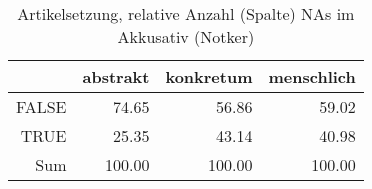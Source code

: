 \begin{table}[ht]
\centering
\begin{tabular}{rrrr}
  \hline
 & abstrakt & konkretum & menschlich \\ 
  \hline
FALSE & 74.65 & 56.86 & 59.02 \\ 
  TRUE & 25.35 & 43.14 & 40.98 \\ 
  Sum & 100.00 & 100.00 & 100.00 \\ 
   \hline
\end{tabular}
\caption{Artikelsetzung, relative Anzahl (Spalte) NAs im Akkusativ (Notker)} 
\end{table}
